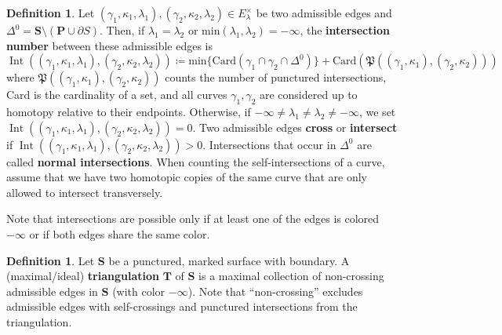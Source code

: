 \documentclass[11pt]{amsart}
\theoremstyle{plain}
\theoremstyle{definition}
\newtheorem{definition}[theorem]{Definition}
\numberwithin{equation}{section}
\def\surf{\mathbf{S}}                       %
\def\TT{\mathbf{T}}
\def\PP{\mathbf{P}}
\newcommand{\Int}{\operatorname{Int}}
\begin{document}
\begin{definition}
    Let $(\gamma_1,\kappa_1,\lambda_1), (\gamma_2,\kappa_2,\lambda_2) \in E^\times_\lambda$ be two admissible edges and $\Delta^0 = \surf \setminus (\PP \cup \partial S)$. Then, if $\lambda_1 = \lambda_2$ or $\text{min}(\lambda_1,\lambda_2) = -\infty$, the \textbf{intersection number} between these admissible edges is 
    $$\Int( (\gamma_1,\kappa_1,\lambda_1), (\gamma_2,\kappa_2,\lambda_2) ) \coloneqq
        \text{min}\{ \text{Card} (\gamma_1 \cap \gamma_2 \cap \Delta^0 ) \} + \text{Card}( \mathfrak{P}( (\gamma_1,\kappa_1), (\gamma_2,\kappa_2) ) )$$ 
    where $ \mathfrak{P}( (\gamma_1,\kappa_1), (\gamma_2,\kappa_2) )$ counts the number of punctured intersections, Card is the cardinality of a set, and all curves $\gamma_1, \gamma_2$ are considered up to homotopy relative to their endpoints.
    Otherwise, if $-\infty \neq \lambda_1 \neq \lambda_2 \neq -\infty$, we set $\Int( (\gamma_1,\kappa_1,\lambda_1), (\gamma_2,\kappa_2,\lambda_2) ) = 0$.
    Two admissible edges \textbf{cross} or \textbf{intersect} if $\Int( (\gamma_1,\kappa_1,\lambda_1), (\gamma_2,\kappa_2,\lambda_2) ) > 0$.
    Intersections that occur in $\Delta^0$ are called \textbf{normal intersections}.
    When counting the self-intersections of a curve, assume that we have two homotopic copies of the same curve that are only allowed to intersect transversely.
\end{definition}

Note that intersections are possible only if at least one of the edges is colored $-\infty$ or if both edges share the same color.

\begin{definition}\label{def-tri}
    Let $\surf$ be a punctured, marked surface with boundary. 
    A (maximal/ideal) \textbf{triangulation} $\TT$ of $\surf$ is a maximal collection of non-crossing admissible edges in $\surf$ (with color $-\infty$). 
    Note that ``non-crossing'' excludes admissible edges with self-crossings and punctured intersections from the triangulation.
\end{definition}
\end{document}

